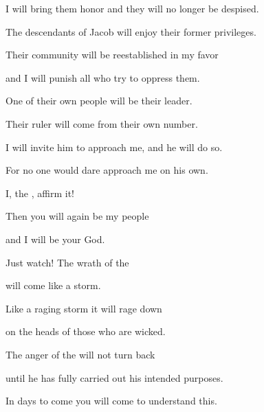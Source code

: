 {\par }{\Q I will bring them honor
and they will no
longer be despised.
\par }{\Q {}The descendants
of Jacob will enjoy their former
privileges.
\par }{\Q Their community
will be reestablished
in my favor

\par }{\Q and I will punish
all
who try to oppress them.
\par }{\Q {}One of their own
people will be
their leader.
\par }{\Q Their ruler
will come
from their own
number.

\par }{\Q I will invite
him to approach
me, and he will do so.

\par }{\Q For
no one
would dare
approach
me on his own.

\par }{\Q I, the
{}, affirm it!
\par }{\Q {}Then you will again be
my people
\par }{\Q and I
will be
your God.
\par }{\Q {}Just watch! The wrath
of the {}
\par }{\Q will come like a storm.
\par }{\Q Like a raging
storm
it will rage
down
\par }{\Q on
the heads
of those
who are
wicked.
\par }{\Q {}The anger
of the {}
will not
turn back
\par }{\Q until
he has fully carried out his intended purposes.
\par }{\Q In days
to come
you will come to understand this.

}
